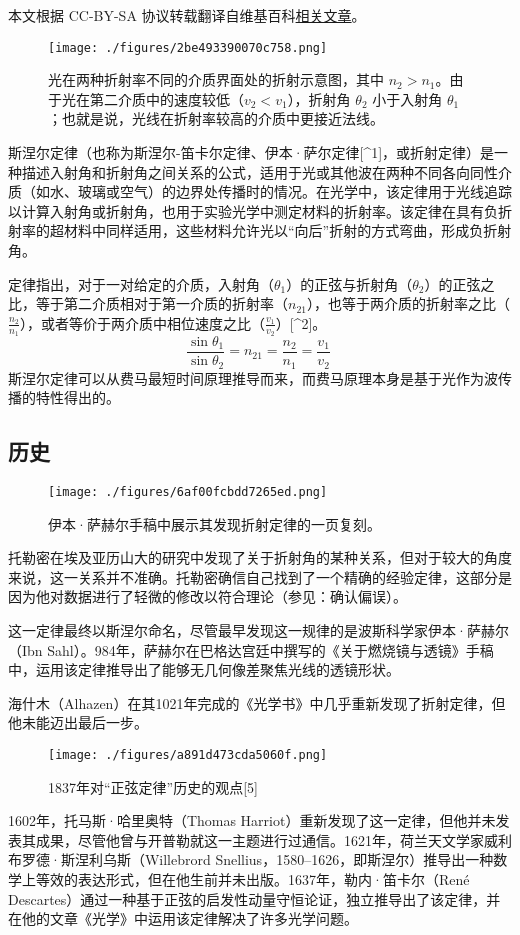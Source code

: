 
本文根据 CC-BY-SA 协议转载翻译自维基百科\href{https://en.wikipedia.org/wiki/Maxwell\%27s_equations}{相关文章}。

\begin{figure}[ht]
\centering
\texttt{[image: ./figures/2be493390070c758.png]}
\caption{光在两种折射率不同的介质界面处的折射示意图，其中 \( n_2 > n_1 \)。由于光在第二介质中的速度较低（\( v_2 < v_1 \)），折射角 \( \theta_2 \) 小于入射角 \( \theta_1 \)；也就是说，光线在折射率较高的介质中更接近法线。} \label{fig_SNR_1}
\end{figure}

斯涅尔定律（也称为斯涅尔-笛卡尔定律、伊本·萨尔定律[^1]，或折射定律）是一种描述入射角和折射角之间关系的公式，适用于光或其他波在两种不同各向同性介质（如水、玻璃或空气）的边界处传播时的情况。在光学中，该定律用于光线追踪以计算入射角或折射角，也用于实验光学中测定材料的折射率。该定律在具有负折射率的超材料中同样适用，这些材料允许光以“向后”折射的方式弯曲，形成负折射角。

定律指出，对于一对给定的介质，入射角（\( \theta_1 \)）的正弦与折射角（\( \theta_2 \)）的正弦之比，等于第二介质相对于第一介质的折射率（\( n_{21} \)），也等于两介质的折射率之比（\( \frac{n_2}{n_1} \)），或者等价于两介质中相位速度之比（\( \frac{v_1}{v_2} \)）[^2]。
\[
\frac{\sin \theta_1}{\sin \theta_2} = n_{21} = \frac{n_2}{n_1} = \frac{v_1}{v_2}~
\]
斯涅尔定律可以从费马最短时间原理推导而来，而费马原理本身是基于光作为波传播的特性得出的。
\subsection{历史}
\begin{figure}[ht]
\centering
\texttt{[image: ./figures/6af00fcbdd7265ed.png]}
\caption{伊本·萨赫尔手稿中展示其发现折射定律的一页复刻。} \label{fig_SNR_2}
\end{figure}
托勒密在埃及亚历山大的研究中发现了关于折射角的某种关系，但对于较大的角度来说，这一关系并不准确。托勒密确信自己找到了一个精确的经验定律，这部分是因为他对数据进行了轻微的修改以符合理论（参见：确认偏误）。

这一定律最终以斯涅尔命名，尽管最早发现这一规律的是波斯科学家伊本·萨赫尔（Ibn Sahl）。984年，萨赫尔在巴格达宫廷中撰写的《关于燃烧镜与透镜》手稿中，运用该定律推导出了能够无几何像差聚焦光线的透镜形状。

海什木（Alhazen）在其1021年完成的《光学书》中几乎重新发现了折射定律，但他未能迈出最后一步。
\begin{figure}[ht]
\centering
\texttt{[image: ./figures/a891d473cda5060f.png]}
\caption{1837年对“正弦定律”历史的观点[5]} \label{fig_SNR_3}
\end{figure}
1602年，托马斯·哈里奥特（Thomas Harriot）重新发现了这一定律，但他并未发表其成果，尽管他曾与开普勒就这一主题进行过通信。1621年，荷兰天文学家威利布罗德·斯涅利乌斯（Willebrord Snellius，1580–1626，即斯涅尔）推导出一种数学上等效的表达形式，但在他生前并未出版。1637年，勒内·笛卡尔（René Descartes）通过一种基于正弦的启发性动量守恒论证，独立推导出了该定律，并在他的文章《光学》中运用该定律解决了许多光学问题。


